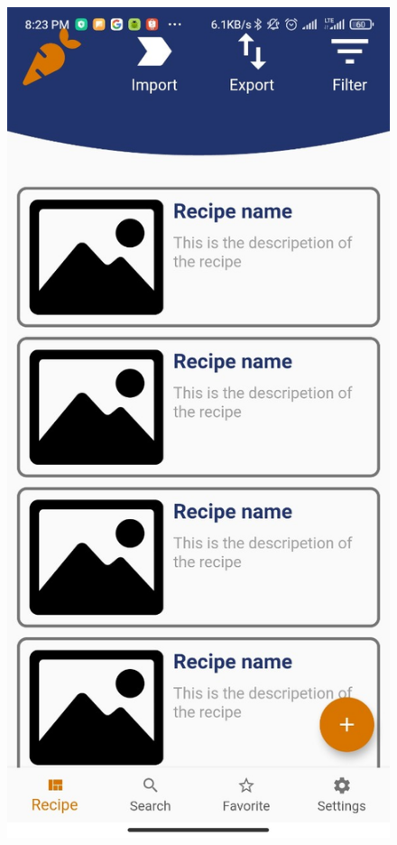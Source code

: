 \documentclass{article}
\begin{document}
\begin{figure}[h!]
    \includegraphics[scale=0.12]{Images/CookingBook.jpg}

\end{figure}
\end{document}
